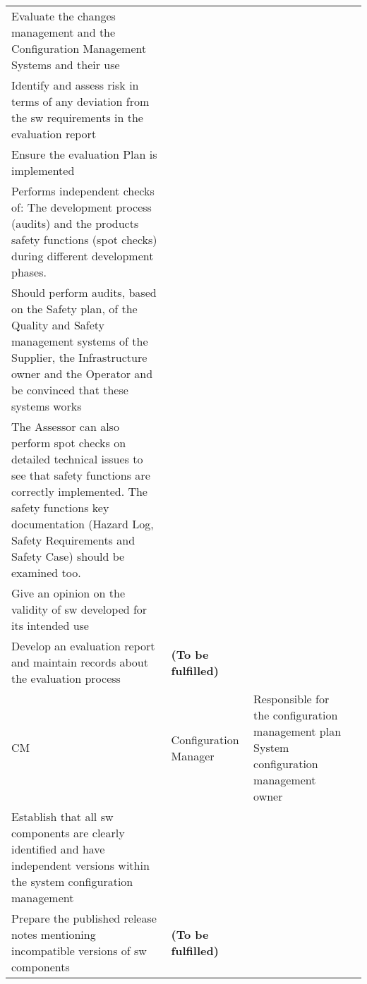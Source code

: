 \documentclass{template/openetcs_article}
\begin{document}
\begin{landscape}
\begin{appendices}
\begin{center}
\begin{longtable}{|m{1cm}|m{}|m{11cm}|m{10cm}|}
Evaluate the changes management and the Configuration Management Systems and their use\\
Identify and assess risk in terms of any deviation from the sw requirements in the evaluation report\\
Ensure the evaluation Plan is implemented\\
Performs independent checks of: The development process (audits) and the products safety functions (spot checks) during different development phases.\\
Should perform audits, based on the Safety plan, of the Quality and Safety management systems of the Supplier, the Infrastructure owner and the Operator and be convinced that these systems works\\
The Assessor can also perform spot checks on detailed technical issues to see that safety functions are correctly implemented. The safety functions key documentation (Hazard Log, Safety Requirements and Safety Case) should be examined too.\\
Give an opinion on the validity of sw developed for its intended use\\
Develop an evaluation report and maintain records about the evaluation process
&
\textbf{(To be fulfilled)}
\\\hline
CM &
Configuration Manager &
\raggedright
Responsible for the configuration management plan \citep{scmp}
System configuration management owner\\
Establish that all sw components are clearly identified and have independent versions within the system configuration management\\
Prepare the published release notes mentioning incompatible versions of sw components
&
\textbf{(To be fulfilled)}
\\\hline
\end{longtable}
\end{center}
\end{appendices}
\end{landscape}
\end{document}
